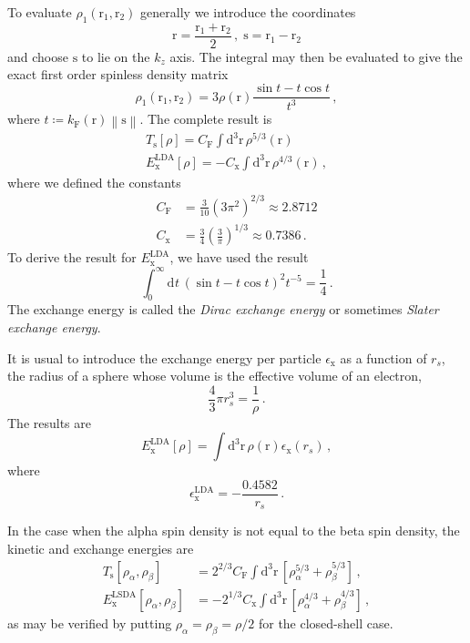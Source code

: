 \documentclass{article}
\theoremstyle{plain}\theoremheaderfont{\normalfont\itshape}\theorembodyfont{\rmfamily}\theoremseparator{.}\newtheorem*{rem}{Remark}\newtheorem*{ex}{Example}\newtheorem*{proof}{Proof}\newtheorem*{altp}{Alternative proof}
\theoremstyle{plain}\theoremheaderfont{\normalfont\bfseries}\theorembodyfont{\rmfamily}\theoremseparator{.}\newtheorem{thm}{Theorem}[section]\newtheorem{lem}[thm]{Lemma}\newtheorem{prop}[thm]{Proposition}\newtheorem*{cor}{Corollary}\newtheorem{defn}[thm]{Definition}\newtheorem{clm}[thm]{Claim}\newtheorem{clminproof}{Claim}
\theoremstyle{break}\theoremheaderfont{\normalfont\itshape}\theorembodyfont{\rmfamily}\theoremseparator{.\medskip}\newtheorem*{proofskip}{Proof}\newtheorem*{exs}{Examples}\newtheorem*{rems}{Remarks}
\theoremstyle{break}\theoremheaderfont{\normalfont\bfseries}\theorembodyfont{\rmfamily}\theoremseparator{.\medskip}\newtheorem{lemskip}[thm]{Lemma}\newtheorem{defnskip}[thm]{Definition}\newtheorem{propskip}[thm]{Proposition}\newtheorem{thmskip}[thm]{Theorem}
\numberwithin{equation}{section}
\newcommand{\dd}[2][]{\mathrm{d}^{#1} #2\,}
\newcommand{\vb}[1]{\bm{\mathrm{#1}}}
\newcommand{\norm}[1]{\left\| #1 \right\|}
\newcommand{\s}{_{\text{s}}}
\newcommand{\x}{_{\text{x}}}
\begin{document}
    To evaluate \(\rho_{1}(\vb{r}_1,\vb{r}_2)\) generally we introduce the coordinates
    \begin{equation}
        \vb{r}=\frac{\vb{r}_1+\vb{r}_2}{2}\,,\;\vb{s}=\vb{r}_1-\vb{r}_2
    \end{equation}
    and choose \(\vb{s}\) to lie on the \(k_z\) axis. The integral may then be evaluated to give the exact first order spinless density matrix
    \begin{equation}
        \rho_1(\vb{r}_1,\vb{r}_2)=3\rho(\vb{r})\frac{\sin t-t\cos t}{t^3}\,,
    \end{equation}
    where \(t\coloneqq k_{\text{F}}(\vb{r})\norm{\vb{s}}\). The complete result is
    \begin{align}
        T\s[\rho]=C_{\text{F}}\int\dd[3]{\vb{r}}\rho^{5/3}(\vb{r})\\
        E\x^{\text{LDA}}[\rho]=-C\x\int\dd[3]{\vb{r}}\rho^{4/3}(\vb{r})\,,
    \end{align}
    where we defined the constants
    \begin{align}
        C_{\text{F}}&=\frac{3}{10}(3\pi^2)^{2/3}\approx 2.8712\\
        C\x&=\frac{3}{4}\left(\frac{3}{\pi}\right)^{1/3}\approx 0.7386\,.
    \end{align}
    To derive the result for \(E\x^{\text{LDA}}\), we have used the result
    \begin{equation}
        \int_{0}^{\infty}\dd{t}(\sin t-t\cos t)^2 t^{-5}=\frac{1}{4}\,.
    \end{equation}
    The exchange energy is called the \textit{Dirac exchange energy} or sometimes \textit{Slater exchange energy}.

    It is usual to introduce the exchange energy per particle \(\epsilon\x\) as a function of \(r_s\), the radius of a sphere whose volume is the effective volume of an electron,
    \begin{equation}
        \frac{4}{3}\pi r_s^3=\frac{1}{\rho}\,.
    \end{equation}
    The results are
    \begin{equation}
        E\x^{\text{LDA}}[\rho]=\int\dd[3]{\vb{r}}\rho(\vb{r})\epsilon\x(r_s)\,,
    \end{equation}
    where
    \begin{equation}
        \epsilon\x^{\text{LDA}}=-\frac{0.4582}{r_s}\,.
    \end{equation}

    In the case when the alpha spin density is not equal to the beta spin density, the kinetic and exchange energies are
    \begin{align}
        T\s[\rho_\alpha,\rho_\beta]&=2^{2/3}C_{\text{F}}\int\dd[3]{\vb{r}}[\rho_\alpha^{5/3}+\rho_\beta^{5/3}]\,,\\
        E\x^{\text{LSDA}}[\rho_\alpha,\rho_\beta]&=-2^{1/3}C\x\int\dd[3]{\vb{r}}[\rho_\alpha^{4/3}+\rho_\beta^{4/3}]\,,
    \end{align}
    as may be verified by putting \(\rho_\alpha=\rho_\beta=\rho/2\) for the closed-shell case.
\end{document}
